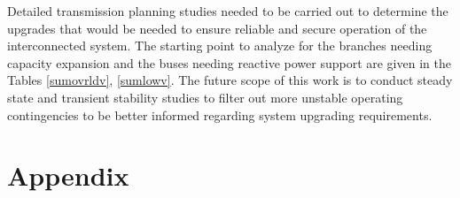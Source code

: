 \documentclass[10pt]{report}
\begin{document}
Detailed transmission planning studies needed to be carried out to determine the upgrades that would be needed to ensure reliable and secure operation of the interconnected system. The starting point to analyze for the branches needing capacity expansion and the buses needing reactive power support are given in the Tables \ref{sumovrldv}, \ref{sumlowv}. The future scope of this work is to conduct steady state and transient stability studies to filter out more unstable operating contingencies to be better informed regarding system upgrading requirements. 



\chapter*{Appendix}
\label{chapter:app}

\begin{table}[H]
\caption{Summary of Branch loading violation counts}
\label{sumovrldv}
\centering
{}
\end{table}

\begin{table}[H]
\caption{Summary of Bus Upper voltage violation counts}
\label{sumupv}
\centering
{}
\end{table}
\end{document}
